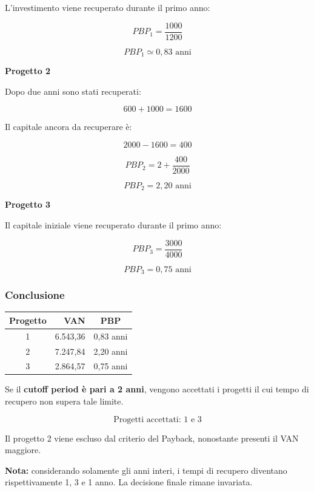 \noindent L'investimento viene recuperato durante il primo anno:

\[
PBP_1=\frac{1000}{1200}
\]

\[
\boxed{PBP_1\simeq0{,}83\text{ anni}}
\]

\medskip

\noindent \textbf{Progetto 2}

\noindent Dopo due anni sono stati recuperati:

\[
600+1000=1600
\]

\noindent Il capitale ancora da recuperare è:

\[
2000-1600=400
\]

\[
PBP_2=2+\frac{400}{2000}
\]

\[
\boxed{PBP_2=2{,}20\text{ anni}}
\]

\medskip

\noindent \textbf{Progetto 3}

\noindent Il capitale iniziale viene recuperato
durante il primo anno:

\[
PBP_3=\frac{3000}{4000}
\]

\[
\boxed{PBP_3=0{,}75\text{ anni}}
\]

\subsubsection*{Conclusione}

\begin{center}
\begin{tabular}{|c|r|c|}
\hline
\textbf{Progetto} & \textbf{VAN} & \textbf{PBP} \\
\hline
1 & 6.543,36 & 0,83 anni \\
2 & 7.247,84 & 2,20 anni \\
3 & 2.864,57 & 0,75 anni \\
\hline
\end{tabular}
\end{center}

\noindent Se il \textbf{cutoff period è pari a 2 anni},
vengono accettati i progetti il cui tempo di recupero
non supera tale limite.

\[
\boxed{\text{Progetti accettati: 1 e 3}}
\]

\noindent Il progetto 2 viene escluso dal criterio del Payback,
nonostante presenti il VAN maggiore.

\medskip

\noindent \textbf{Nota:} considerando solamente gli anni interi,
i tempi di recupero diventano rispettivamente 1, 3 e 1 anno.
La decisione finale rimane invariata.


